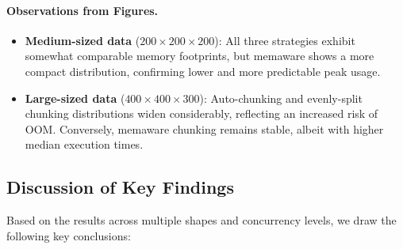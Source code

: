 \paragraph{Observations from Figures.}
\begin{itemize}
    \item \textbf{Medium-sized data} (\(200 \times 200 \times 200\)): All three strategies exhibit somewhat comparable memory footprints, but memaware shows a more compact distribution, confirming lower and more predictable peak usage.
    \item \textbf{Large-sized data} (\(400 \times 400 \times 300\)): Auto-chunking and evenly-split chunking distributions widen considerably, reflecting an increased risk of \ac{OOM}. Conversely, memaware chunking remains stable, albeit with higher median execution times.
\end{itemize}

\subsection{Discussion of Key Findings}
\label{subsec:discussion-of-results}

Based on the results across multiple shapes and concurrency levels, we draw the following key conclusions:

